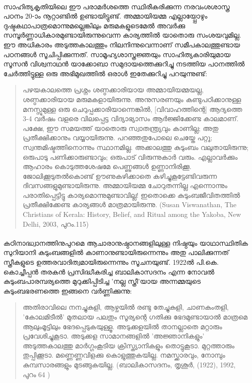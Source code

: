 \paragraph{}സാഹിത്യകൃതിയിലെ ഈ പരാമർശത്തെ സ്ഥിരീകരിക്കുന്ന നരവംശശാസ്ത്ര പഠനം 20-ാം നൂറ്റാണ്ടിൽ ഉണ്ടായിട്ടുണ്ട്. അമ്മായിയമ്മ എല്ലായ്പ്പോഴും ദുഷ്ടകഥാപാത്രമൊന്നുമല്ലെങ്കിലും മരുമകളുടെമേൽ അവർക്കു സമ്പൂർണ്ണാധികാരമുണ്ടായിരുന്നുവെന്ന കാര്യത്തിൽ യാതൊരു സംശയവുമില്ല. ഈ അധികാരം അടുത്തകാലത്തും നിലനിന്നുവെന്നാണ് സമീപകാലത്തുണ്ടായ പഠനങ്ങൾ സൂചിപ്പിക്കുന്നത്. സാമൂഹ്യശാസ്ത്രജ്ഞയും സാഹിത്യകാരിയുമായ സൂസൻ വിശ്വനാഥൻ യാക്കോബാ സമുദായത്തെക്കുറിച്ചു നടത്തിയ പഠനത്തിൽ ചേർത്തിട്ടുള്ള ഒരു അഭിമുഖത്തിൽ ഒരാൾ ഇതേക്കുറിച്ചു പറയുന്നുണ്ട്:
\begin{quotation}
പഴയകാലത്തെ പ്രശ്നം ശണ്ഠക്കാരിയായ അമ്മായിയമ്മയല്ല, ശണ്ഠക്കാരിയായ മരുമകളായിരുന്നു. അനുസരണയും കണ്ടുപഠിക്കാനുള്ള മനസ്സുമുള്ള ഒരു ചെറുപ്പക്കാരിയാന്നെങ്കിൽ, [വിവാഹത്തിന്റെ] ആദ്യത്തെ 3-4 വർഷം വളരെ വിലപ്പെട്ട വിദ്യാഭ്യാസം ആർജ്ജിക്കേണ്ട കാലമാണ്. പക്ഷേ, ഈ സമയത്ത് യാതൊരു സ്വാതന്ത്ര്യവും കാണില്ല; അതു പ്രതീക്ഷിക്കാനും വയ്യായിരുന്നു. പറഞ്ഞതുപോലെ ചെയ്തേ പറ്റൂ; സ്വന്തമിഷ്ടത്തിനൊന്നും സ്ഥാനമില്ല. അക്കാലത്തു കുടുംബം വലുതായിരുന്നു; ഒരുപാടു പണിക്കാരുണ്ടാവും; ഒരുപാട് വിരുന്നുകാർ വരും. എല്ലാവർക്കും ആഹാരം കൊടുത്തശേഷമേ പെണ്ണുങ്ങൾ ഉണ്ണാനിരിക്കൂ. ജോലിക്കൂടുതൽകൊണ്ട് ഊണുകഴിക്കാതെ കഴിച്ചുകൂട്ടേണ്ടിവരുന്ന ദിവസങ്ങളുമുണ്ടായിരുന്നു. അമ്മായിയമ്മ ചോറുതന്നില്ല എന്നൊന്നും പരാതിപ്പെട്ടിട്ടു കാര്യമൊന്നുമുണ്ടാവില്ല! ഇതൊക്കെ കുടുംബജീവിതത്തിൽ പ്രതീക്ഷിക്കേണ്ട കാര്യങ്ങൾ മാത്രമായിരുന്നു.
(Susan Viswanathan, The Christians of Kerala: History, Belief, and Ritual among the Yakoba, New Delhi, 2003, പുറം.115)
\end{quotation}
\paragraph{}കഠിനാദ്ധ്വാനത്തിനുപുറമെ ആചാരാനുഷ്ഠാനങ്ങളിലുള്ള നിഷ്ഠയും യാഥാസ്ഥിതിക സുറിയാനി കുടുംബങ്ങളിൽ കാണാനുണ്ടായിരുന്നെന്നും അതു പാലിക്കുന്നത് സ്ത്രീകളുടെ ഉത്തരവാദിത്വമായിരുന്നെന്നും സൂചനയുണ്ട്. 1922ൽ പി.കെ. കൊച്ചീപ്പൻ തരകൻ പ്രസിദ്ധീകരിച്ച ബാലികാസദനം എന്ന നോവൽ കുടുംബപാരമ്പര്യത്തെ മുറുക്കിപ്പിടിച്ച 'നല്ല സ്ത്രീ'യായ അന്നമ്മയുടെ കുടുംബഭരണത്തെ ഇങ്ങനെ വർണ്ണിക്കുന്നു:
\begin{quotation}
അതിരാവിലെ നനച്ചുകുളി, ആഴ്ചയിൽ രണ്ടു തേച്ചുകുളി, ചാണകംതളി, 'കോലമിടീൽ' മുതലായ പലതും സൂര്യന്റെ ഗതിക്കു ഭേദമുണ്ടായാൽ മാത്രമെ ആലുംമൂട്ടിലും ഭേദപ്പെടുകയുള്ളൂ. അടുക്കളയിൽ താനല്ലാതെ മറ്റാരും പ്രവേശിച്ചുകൂടാ. അടുക്കള സാമാനങ്ങളിൽ 'അജ്ഞാനികളും' അടുത്തകാലത്തു മാർഗ്ഗംകൂടിയ ക്രിസ്ത്യാനികളും തൊട്ടുകൂടാ. മുറ്റത്താരും തുപ്പിക്കൂടാ. മണ്ണെണ്ണവിളക്കു കൊളുത്തുകയില്ല. നമസ്ക്കാരവും, നോമ്പും കുമ്പസാരങ്ങളും മുടങ്ങുകയില്ല.
(ബാലികാസദനം, തൃശൂർ, (1922), 1992, പുറം 64 )
\end{quotation}

